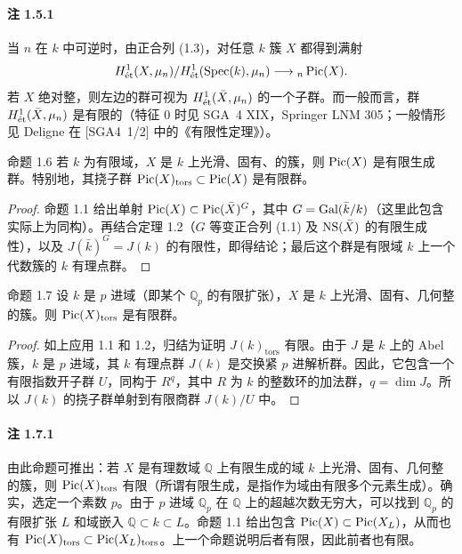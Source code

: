 \paragraph{注 1.5.1}
当 $n$ 在 $k$ 中可逆时，由正合列 (1.3)，对任意 $k$ 簇 $X$ 都得到满射
\[
H^1_{\mathrm{\acute et}}(X,\mu_n)/H^1_{\mathrm{\acute et}}(\operatorname{Spec}(k),\mu_n)\longrightarrow{}_n\operatorname{Pic}(X).
\]
若 $X$ 绝对整，则左边的群可视为 $H^1_{\mathrm{\acute et}}(\bar X,\mu_n)$ 的一个子群。而一般而言，群 $H^1_{\mathrm{\acute et}}(\bar X,\mu_n)$ 是有限的（特征 $0$ 时见 SGA~4 XIX，Springer LNM 305；一般情形见 Deligne 在 [SGA4~1/2] 中的《有限性定理》）。

\begin{statement}{命题 1.6}
若 $k$ 为有限域，$X$ 是 $k$ 上光滑、固有、的簇，则 $\operatorname{Pic}(X)$ 是有限生成群。特别地，其挠子群 $\operatorname{Pic}(X)_{\mathrm{tors}}\subset\operatorname{Pic}(X)$ 是有限群。
\end{statement}
\begin{proof}
命题 1.1 给出单射 $\operatorname{Pic}(X)\subset\operatorname{Pic}(\bar X)^G$，其中 $G=\operatorname{Gal}(\bar k/k)$（这里此包含实际上为同构）。再结合定理 1.2（$G$ 等变正合列 (1.1) 及 $\operatorname{NS}(\bar X)$ 的有限生成性），以及 $J(\bar k)^G=J(k)$ 的有限性，即得结论；最后这个群是有限域 $k$ 上一个代数簇的 $k$ 有理点群。
\end{proof}

\begin{statement}{命题 1.7}
设 $k$ 是 $p$ 进域（即某个 $\mathbb Q_p$ 的有限扩张），$X$ 是 $k$ 上光滑、固有、几何整的簇。则 $\operatorname{Pic}(X)_{\mathrm{tors}}$ 是有限群。
\end{statement}
\begin{proof}
如上应用 1.1 和 1.2，归结为证明 $J(k)_{\mathrm{tors}}$ 有限。由于 $J$ 是 $k$ 上的 Abel 簇，$k$ 是 $p$ 进域，其 $k$ 有理点群 $J(k)$ 是交换紧 $p$ 进解析群。因此，它包含一个有限指数开子群 $U$，同构于 $R^q$，其中 $R$ 为 $k$ 的整数环的加法群，$q=\dim J$。所以 $J(k)$ 的挠子群单射到有限商群 $J(k)/U$ 中。
\end{proof}
\paragraph{注 1.7.1}
由此命题可推出：若 $X$ 是有理数域 $\mathbb Q$ 上有限生成的域 $k$ 上光滑、固有、几何整的簇，则 $\operatorname{Pic}(X)_{\mathrm{tors}}$ 有限（所谓有限生成，是指作为域由有限多个元素生成）。确实，选定一个素数 $p$。由于 $p$ 进域 $\mathbb Q_p$ 在 $\mathbb Q$ 上的超越次数无穷大，可以找到 $\mathbb Q_p$ 的有限扩张 $L$ 和域嵌入 $\mathbb Q\subset k\subset L$。命题 1.1 给出包含 $\operatorname{Pic}(X)\subset\operatorname{Pic}(X_L)$，从而也有 $\operatorname{Pic}(X)_{\mathrm{tors}}\subset\operatorname{Pic}(X_L)_{\mathrm{tors}}$。上一个命题说明后者有限，因此前者也有限。


